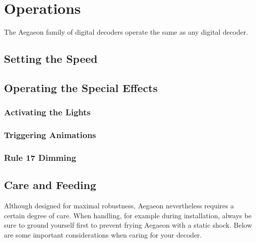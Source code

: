 \documentclass[12pt,letterpaper,draft]{memoir} %
\begin{document}
\chapter{Operations}
\label{operations}

The Aegaeon family of digital decoders operate the same as any digital decoder.

\section{Setting the Speed}


\section{Operating the Special Effects}

\subsection{Activating the Lights}
\label{softstart}

\subsection{Triggering Animations}
\label{animations}

\subsection{Rule 17 Dimming}
\label{Rule17}

\section{Care and Feeding}

Although designed for maximal robustness, Aegaeon nevertheless requires a certain degree of care. When handling, for example during installation, always be sure to ground yourself first to prevent frying Aegaeon with a static shock. Below are some important considerations when caring for your decoder.
\end{document}
